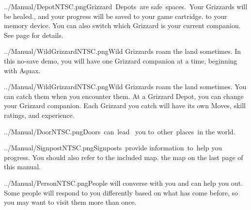 \documentclass[9pt,twocolumn,openany,article]{memoir}
\newcommand\englishskip{\vspace{14pt}}
\begin{document}
\ifdefined\ATARIAGESAVE \pagebreak \else \englishskip \fi

\lettrine[image=true,                lines=4,               findent=3pt,
nindent=3pt]{../Manual/DepotNTSC.png}{}\noindent{}Grizzard~Depots~are
safe~spaces.~Your Grizzards will be healed\ifdefined\NOSAVE{}.{}\else{},
and your  progress will  be saved  \ifdefined\ATARIAGESAVE to  your game
cartridge. \else  to your memory device.  \fi You can also  switch which
Grizzard    is     your    current     companion.    \fi     See    page
\pageref{sec:GrizzardDepot} for details.

\englishskip

\ifdefined\NOSAVE

\lettrine[image=true,                lines=4,               findent=3pt,
nindent=3pt]{../Manual/WildGrizzardNTSC.png}{}\noindent{}Wild  Grizzards
roam  the land  sometimes.  In  this no-save  demo,  you  will have  one
Grizzard companion at a time, beginning with Aquax.

\else

\lettrine[image=true,                lines=4,               findent=3pt,
nindent=3pt]{../Manual/WildGrizzardNTSC.png}{}\noindent{}Wild  Grizzards
roam the  land sometimes. You  can catch  them when you  encounter them.
At  a   Grizzard  Depot,  you   can  change  your   Grizzard  companion.
Each  Grizzard  you  catch  will  have its  own  Moves,  skill  ratings,
and experience.

\fi

\englishskip

\lettrine[image=true,                lines=4,               findent=3pt,
nindent=3pt]{../Manual/DoorNTSC.png}{}\noindent{}Doors~can~lead~ you
to~other~places~in the world. \\

\englishskip

\lettrine[image=true,                lines=4,               findent=3pt,
nindent=3pt]{../Manual/SignpostNTSC.png}{}\noindent{}Signposts~provide
information~to~help   you   progress.   You   should   also   refer   to
\ifdefined\ATARIAGESAVE the included map. \else the map on the last page
of this manual. \fi

\englishskip

\lettrine[image=true,                lines=4,               findent=3pt,
nindent=3pt]{../Manual/PersonNTSC.png}{}\noindent{}People  will converse
with  you  and  can help  you  out.  Some  people  will respond  to  you
differently based on what has come before, so you may want to visit them
more than once.
\end{document}
